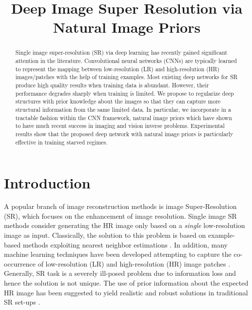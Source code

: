 \documentclass[9pt]{article}
\title{Deep Image Super Resolution via Natural Image Priors}
\def\tcb{\textcolor{blue}}
\begin{document}
%
\maketitle
%
\begin{abstract}
Single image super-resolution (SR) via deep learning has recently gained significant attention in the literature. Convolutional neural networks (CNNs) are typically learned to represent the mapping between low-resolution (LR) and high-resolution (HR) images/patches with the help of training examples. Most existing deep networks for SR produce high quality results when training data is abundant. However, their performance degrades sharply when training is limited. We propose to regularize deep structures with prior knowledge about the images so that they can capture more structural information from the same limited data. In particular, we incorporate in a tractable fashion within the CNN framework, natural image priors which have shown to have much recent success in imaging and vision inverse problems. Experimental results show that the proposed deep network with natural image priors is particularly effective in training starved regimes.
\end{abstract}
%
%

\section{Introduction}
\label{sec:intro}

A popular branch of image reconstruction methods is image Super-Resolution (SR), which focuses on the enhancement of image resolution. %
Single image SR methods consider generating the HR image only based on a \emph{single} low-resolution image as input. Classically, the solution to this problem is based on example-based methods exploiting nearest neighbor estimations \cite{Freeman:ExampleBasedSR_CompGraph2002, Glasner:SRSingle2009ICCV}. In addition, many machine learning techniques have been developed attempting to capture the co-occurrence of low-resolution (LR) and high-resolution (HR) image patches \cite{Sun:HallucinationSR_CVPR2003, Chang:NeighborEmbeddingSR_CVPR2004}.
Generally, SR task is a severely  ill-posed problem due to information loss and hence the solution is not unique. The use of prior information about the expected HR image has been suggested to yield realistic and robust solutions in traditional SR set-ups \cite{Tappen:SparsePriorSR_2003,Fattal:SRstatistic_ACM2007,Dai:edgeSR_CVPR2007, mousavi2016ColorSR_ICIP}.
\end{document}
